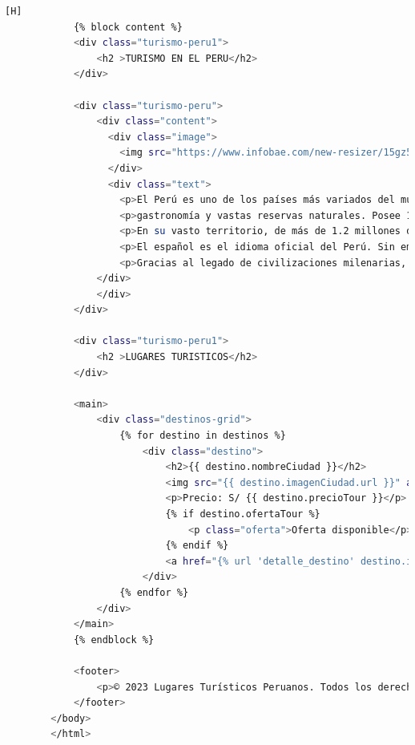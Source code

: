 \documentclass{article}
\begin{document}
        \begin{lstlisting}[language=bash,caption={Segunda parte de destinos\_turisticos.html}][H]
            {% block content %}
            <div class="turismo-peru1">
                <h2 >TURISMO EN EL PERU</h2>
            </div>
        
            <div class="turismo-peru">
                <div class="content">
                  <div class="image">
                    <img src="https://www.infobae.com/new-resizer/15gz5Eezqt7v4W6Ghyw_LlG16Bk=/1200x628/filters:format(webp):quality(85)//cloudfront-us-east-1.images.arcpublishing.com/infobae/3JKG77X2TBE5TKD64X5SQ74F2Y.jpg" alt="Imagen de Peru como sitio turistico">
                  </div>
                  <div class="text">
                    <p>El Perú es uno de los países más variados del mundo. Un país multicultural, lleno de tradiciones, una laureada </p> 
                    <p>gastronomía y vastas reservas naturales. Posee 12 patrimonios mundiales reconocidos por Unesco y es dueño de 84 de las 117 zonas de vida que existen en el mundo.</p>
                    <p>En su vasto territorio, de más de 1.2 millones de km², abarca tres regiones: Costa, Sierra y Selva. Su población actual supera los 31.5 millones de habitantes.</p>
                    <p>El español es el idioma oficial del Perú. Sin embargo, en el país se hablan 47 lenguas nativas, incluyendo el quechua y el aymara. </p>
                    <p>Gracias al legado de civilizaciones milenarias, Perú alberga más de 5000 lugares arqueológicos. Muchos de ellos se encuentran aún rodeados de misterio, pero igual son capaces de transportar al visitante a la época donde florecieron estas culturas.</p>
                </div>
                </div>
            </div>
        
            <div class="turismo-peru1">
                <h2 >LUGARES TURISTICOS</h2>
            </div>
        
            <main>
                <div class="destinos-grid">
                    {% for destino in destinos %}
                        <div class="destino">
                            <h2>{{ destino.nombreCiudad }}</h2>
                            <img src="{{ destino.imagenCiudad.url }}" alt="{{ destino.nombreCiudad }}">
                            <p>Precio: S/ {{ destino.precioTour }}</p>
                            {% if destino.ofertaTour %}
                                <p class="oferta">Oferta disponible</p>
                            {% endif %}
                            <a href="{% url 'detalle_destino' destino.id %}" class="ver-btn">VER</a>
                        </div>
                    {% endfor %}
                </div>
            </main>
            {% endblock %}
            
            <footer>
                <p>© 2023 Lugares Turísticos Peruanos. Todos los derechos reservados. Hecho por Jose Gordillo Mendoza</p>
            </footer>
        </body>
        </html>
	\end{lstlisting}
\end{document}
